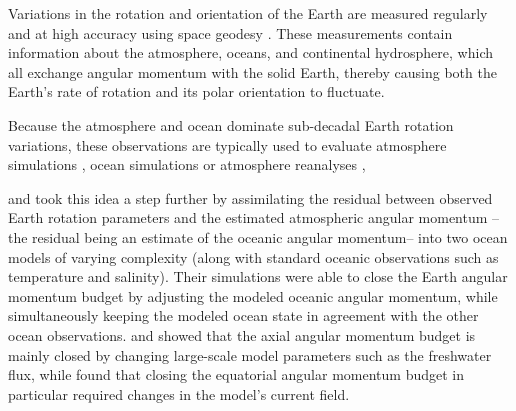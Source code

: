 
Variations in the rotation and orientation of the Earth are measured regularly and at high accuracy using space geodesy \citep{Gross1992,iers}. 
These measurements contain information about the atmosphere, oceans, and continental hydrosphere, which all exchange angular momentum with the solid Earth, thereby causing both the Earth's rate of rotation and its polar orientation to fluctuate. 

Because the atmosphere and ocean dominate sub-decadal Earth rotation variations, 
these observations are typically used to evaluate  
atmosphere simulations \citep{Boer1990, Rosen2000,Neef2012}, ocean 
simulations \citep{Gross1996a} or atmosphere reanalyses \citep{Yu1999, Aoyama2000, 
Paek2012a,Berrisford2011},

\citet{Saynisch2010,Saynisch2011} and \citet{Saynisch2012} took this idea a step further by assimilating the residual between observed Earth rotation parameters and the estimated atmospheric angular momentum --the residual being an estimate of the oceanic angular momentum-- into two ocean models of varying complexity (along with standard oceanic observations such as temperature and salinity). 
Their simulations were able to close the Earth angular momentum budget by adjusting the modeled oceanic angular momentum, while simultaneously keeping the modeled ocean state in agreement with the other ocean observations.  
\citet{Saynisch2010} and \citet{Saynisch2012} showed that the axial angular momentum budget is mainly closed by changing large-scale model parameters such as the freshwater flux, while \citet{Saynisch2011} found that closing the equatorial angular momentum budget in particular required changes in the model's current field. 


